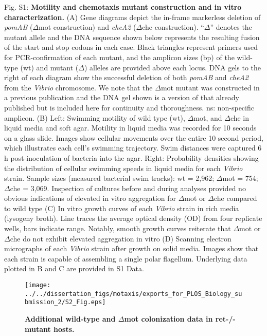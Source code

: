 Fig. S1: \textbf{Motility and chemotaxis mutant construction and in vitro characterization.} (A) Gene diagrams depict the in-frame markerless deletion of \textit{pomAB} ($\Delta$mot construction) and \textit{cheA2} ($\Delta$che construction). ``$\Delta$'' denotes the mutant allele and the DNA sequence shown below represents the resulting fusion of the start and stop codons in each case. Black triangles represent primers used for PCR-confirmation of each mutant, and the amplicon sizes (bp) of the wild-type (wt) and mutant ($\Delta$) alleles are provided above each locus. DNA gels to the right of each diagram show the successful deletion of both \textit{pomAB} and \textit{cheA2} from the \textit{Vibrio} chromosome. We note that the $\Delta$mot mutant was constructed in a previous publication \cite{wiles_modernized_2018} and the DNA gel shown is a version of that already published but is included here for continuity and thoroughness. ns: non-specific amplicon. (B) Left: Swimming motility of wild type (wt), $\Delta$mot, and $\Delta$che in liquid media and soft agar. Motility in liquid media was recorded for 10 seconds on a glass slide. Images show cellular movements over the entire 10 second period, which illustrates each cell's swimming trajectory. Swim distances were captured 6 h post-inoculation of bacteria into the agar. Right: Probability densities showing the distribution of cellular swimming speeds in liquid media for each \textit{Vibrio} strain. Sample sizes (measured bacterial swim tracks): wt = 2,962; $\Delta$mot = 754; $\Delta$che = 3,069. Inspection of cultures before and during analyses provided no obvious indications of elevated in vitro aggregation for $\Delta$mot or $\Delta$che compared to wild type  (C) In vitro growth curves of each \textit{Vibrio} strain in rich media (lysogeny broth). Line traces the average optical density (OD) from four replicate wells, bars indicate range. Notably, smooth growth curves reiterate that $\Delta$mot or $\Delta$che do not exhibit elevated aggregation in vitro  (D) Scanning electron micrographs of each \textit{Vibrio} strain after growth on solid media. Images show that each strain is capable of assembling a single polar flagellum. Underlying data plotted in B and C are provided in S1 Data.

\newpage

\begin{figure}[h!]
	\centerline{
		\texttt{[image: ../../dissertation\_figs/motaxis/exports\_for\_PLOS\_Biology\_submission\_2/S2\_Fig.eps]}}
	\caption{\textbf{Additional wild-type and $\Delta$mot colonization data in ret-/- mutant hosts.}}
\end{figure}


